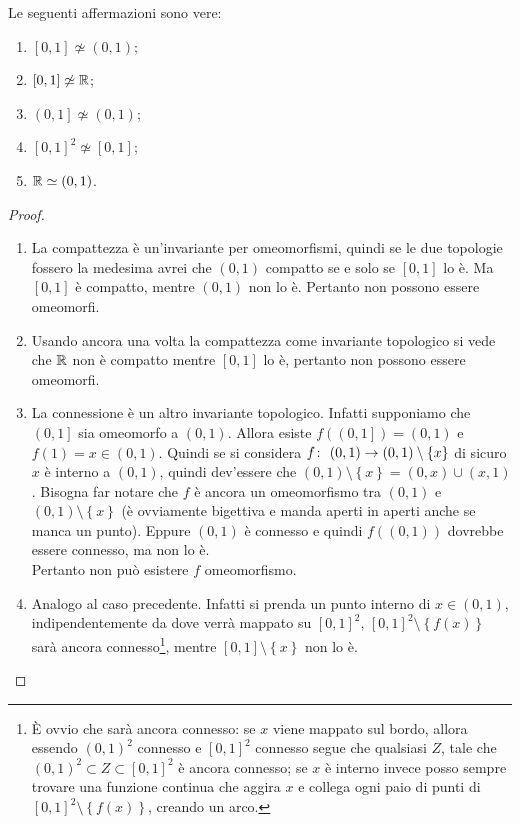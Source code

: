 \begin{theorem}
	Le seguenti affermazioni sono vere:
	\begin{enumerate}
		\item $\left[0,1\right] \not\simeq (0,1)$;
		\item $\left[0,1\right] \not\simeq \mathbb{R}$;
		\item $\left(0,1\right] \not\simeq (0,1)$;
		\item $\left[0,1\right]^2 \not\simeq \left[0,1\right]$;
		\item $\mathbb{R} \simeq (0,1)$.
	\end{enumerate}
\end{theorem}
\begin{proof}\
	\begin{enumerate}
		\item La compattezza è un'invariante per omeomorfismi, quindi se le due topologie fossero la medesima avrei che $(0,1)$ compatto se e solo se $\left[0,1\right]$ lo è. Ma $\left[0,1\right]$ è compatto, mentre $(0,1)$ non lo è. Pertanto non possono essere omeomorfi.
		\item Usando ancora una volta la compattezza come invariante topologico si vede che $\mathbb{R}$ non è compatto mentre $\left[0,1\right]$ lo è, pertanto non possono essere omeomorfi.
		\item La connessione è un altro invariante topologico. Infatti supponiamo che $\left(0,1\right]$ sia omeomorfo a $\left(0,1\right)$. Allora esiste $f(\left(0,1\right]) = \left(0,1\right)$ e $f(1) = x \in (0,1)$. Quindi se si considera $f \colon\ (0,1) \rightarrow (0,1)\setminus \left\{x\right\}$ di sicuro $x$ è interno a $(0,1)$, quindi dev'essere che $(0,1) \setminus \left\{x\right\} = (0, x) \cup (x, 1)$. Bisogna far notare che $f$ è ancora un omeomorfismo tra $(0,1)$ e $(0,1)\setminus \left\{x\right\}$ (è ovviamente bigettiva e manda aperti in aperti anche se manca un punto). Eppure $(0,1)$ è connesso e quindi $f((0,1))$ dovrebbe essere connesso, ma non lo è. \\ Pertanto non può esistere $f$ omeomorfismo.
		\item Analogo al caso precedente. Infatti si prenda un punto interno di $x \in (0,1)$, indipendentemente da dove verrà mappato su $\left[0,1\right]^2$, $\left[0,1\right]^2 \setminus \left\{f(x)\right\}$ sarà ancora connesso\footnote{È ovvio che sarà ancora connesso: se $x$ viene mappato sul bordo, allora essendo $(0,1)^2$ connesso e $\left[0,1\right]^2$ connesso segue che qualsiasi $Z$, tale che $(0,1)^2 \subset Z \subset \left[0,1\right]^2$ è ancora connesso; se $x$ è interno invece posso sempre trovare una funzione continua che aggira $x$ e collega ogni paio di punti di $\left[0,1\right]^2 \setminus \left\{f(x)\right\}$, creando un arco.}, mentre $\left[0,1\right] \setminus \left\{x\right\}$ non lo è. 

\end{enumerate}
\end{proof}
